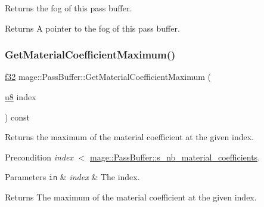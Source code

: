 Returns the fog of this pass buffer.

\begin{DoxyReturn}{Returns}
A pointer to the fog of this pass buffer. 
\end{DoxyReturn}
\hypertarget{structmage_1_1_pass_buffer_a774eb757831b5442154d37b473563848}{}\label{structmage_1_1_pass_buffer_a774eb757831b5442154d37b473563848} 
\subsubsection{\texorpdfstring{Get\+Material\+Coefficient\+Maximum()}{GetMaterialCoefficientMaximum()}}
{\footnotesize\ttfamily \hyperlink{namespacemage_a6a44ad388483959dc4dff9f2aef91431}{f32} mage\+::\+Pass\+Buffer\+::\+Get\+Material\+Coefficient\+Maximum (\begin{DoxyParamCaption}\item[{\hyperlink{namespacemage_a5a362e2d56fc439362a80516ecae7828}{u8}}]{index }\end{DoxyParamCaption}) const\hspace{0.3cm}{\ttfamily [noexcept]}}

Returns the maximum of the material coefficient at the given index.

\begin{DoxyPrecond}{Precondition}
{\itshape index} $<$ \hyperlink{structmage_1_1_pass_buffer_a453e18abdf29c4ebb08d9e002a952bf2}{mage\+::\+Pass\+Buffer\+::s\+\_\+nb\+\_\+material\+\_\+coefficients}. 
\end{DoxyPrecond}

\begin{DoxyParams}[1]{Parameters}
\mbox{\tt in}  & {\em index} & The index. \\
\hline
\end{DoxyParams}
\begin{DoxyReturn}{Returns}
The maximum of the material coefficient at the given index. 
\end{DoxyReturn}
\hypertarget{structmage_1_1_pass_buffer_aaa5e6cb24f1a6b217e6ebca4920a2f05}{}\label{structmage_1_1_pass_buffer_aaa5e6cb24f1a6b217e6ebca4920a2f05} 
